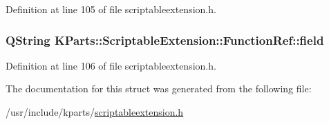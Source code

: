 Definition at line 105 of file scriptableextension.\+h.

\hypertarget{structKParts_1_1ScriptableExtension_1_1FunctionRef_a1e3cffbdcfde393b9ff6243080edbbd4}{
\subsubsection[{field}]{\setlength{\rightskip}{0pt plus 5cm}Q\+String K\+Parts\+::\+Scriptable\+Extension\+::\+Function\+Ref\+::field}}\label{structKParts_1_1ScriptableExtension_1_1FunctionRef_a1e3cffbdcfde393b9ff6243080edbbd4}


Definition at line 106 of file scriptableextension.\+h.



The documentation for this struct was generated from the following file\+:\begin{DoxyCompactItemize}
\item 
/usr/include/kparts/\hyperlink{scriptableextension_8h}{scriptableextension.\+h}\end{DoxyCompactItemize}
